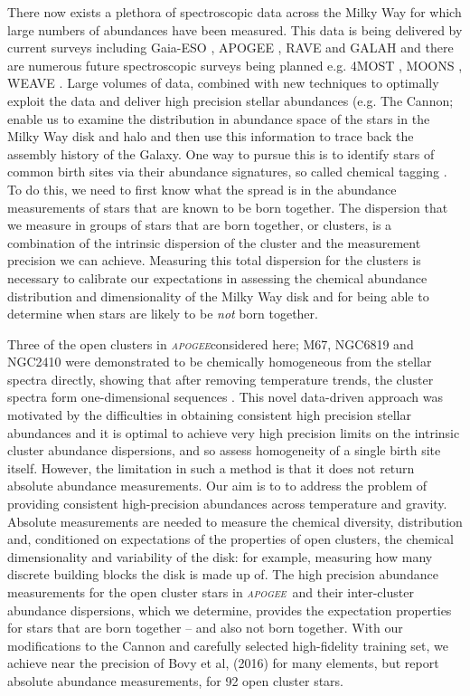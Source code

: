 \documentclass[14pt, preprint2]{aastex6}
\newcommand{\project}[1]{\textsl{#1}}
\newcommand{\apogee}{\project{\textsc{apogee}}}
\begin{document}
There now exists a plethora of spectroscopic data across the Milky Way for which large numbers of abundances have been measured. This data is being delivered by current surveys including Gaia-ESO \citep{gilmore2012}, APOGEE \citep{Majewski2015}, RAVE \citep{Kunder2016, Casey2016b} and GALAH \citep{Freeman2012, deSilva2015} and there are numerous future spectroscopic surveys being planned e.g. 4MOST \citep{deJong2015}, MOONS \citep{C2012}, WEAVE \citep{D2012}. Large volumes of data, combined with new techniques to optimally exploit the data and deliver high precision stellar abundances (e.g. The Cannon; \citep{Ness2015, Casey2016} enable us to examine the distribution in abundance space of the stars in the Milky Way disk and halo and then use this information to trace back the assembly history of the Galaxy. One way to pursue this is to identify stars of common birth sites via their abundance signatures, so called chemical tagging \citep{freeman2002}. To do this, we need to first know what the spread is in the abundance measurements of stars that are known to be born together.  The dispersion that we measure in groups of stars that are born together, or clusters, is a combination of the intrinsic dispersion of the cluster and the measurement precision we can achieve. Measuring this total dispersion for the clusters is necessary to calibrate our expectations in assessing the chemical abundance distribution and dimensionality of the Milky Way disk and for being able to determine when stars are likely to be \textit{not} born together. 

Three of the open clusters in \apogee considered here; M67, NGC6819 and NGC2410 were demonstrated to be chemically homogeneous from the stellar spectra directly, showing that after removing temperature trends, the cluster spectra form one-dimensional sequences \citep{Bovy2016}. This novel data-driven approach was motivated by the difficulties in obtaining consistent high precision stellar abundances and it is optimal to achieve very high precision limits on the intrinsic cluster abundance dispersions, and so assess homogeneity of a single birth site itself. However, the limitation in such a method is that it does not return absolute abundance measurements. Our aim is to to address the problem of providing consistent high-precision abundances across temperature and gravity.  Absolute measurements are needed to measure the chemical diversity, distribution and, conditioned on expectations of the properties of open clusters, the chemical dimensionality and variability of the disk: for example, measuring how many discrete building blocks the disk is made up of.  The high precision abundance measurements for the open cluster stars in \apogee\ and their inter-cluster abundance dispersions, which we determine, provides the expectation properties for stars that are born together -- and also not born together. With our modifications to the Cannon and carefully selected high-fidelity training set, we achieve near the precision of Bovy et al, (2016) for many elements, but report absolute abundance measurements, for 92 open cluster stars. 
\end{document}
